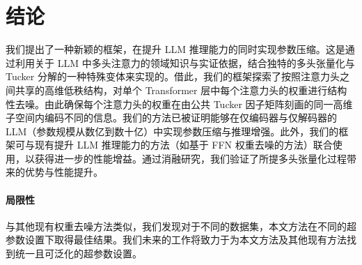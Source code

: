 \documentclass[conference]{IEEEtran}
\begin{document}
\section{结论}
我们提出了一种新颖的框架，在提升 LLM 推理能力的同时实现参数压缩。这是通过利用关于 LLM 中多头注意力的领域知识与实证依据，结合独特的多头张量化与 Tucker 分解的一种特殊变体来实现的。借此，我们的框架探索了按照注意力头之间共享的高维低秩结构，对单个 Transformer 层中每个注意力头的权重进行结构性去噪。由此确保每个注意力头的权重在由公共 Tucker 因子矩阵刻画的同一高维子空间内编码不同的信息。我们的方法已被证明能够在仅编码器与仅解码器的 LLM（参数规模从数亿到数十亿）中实现参数压缩与推理增强。此外，我们的框架可与现有提升 LLM 推理能力的方法（如基于 FFN 权重去噪的方法）联合使用，以获得进一步的性能增益。通过消融研究，我们验证了所提多头张量化过程带来的优势与性能提升。
\paragraph{局限性}
与其他现有权重去噪方法类似，我们发现对于不同的数据集，本文方法在不同的超参数设置下取得最佳结果。我们未来的工作将致力于为本文方法及其他现有方法找到统一且可泛化的超参数设置。




\end{document}
